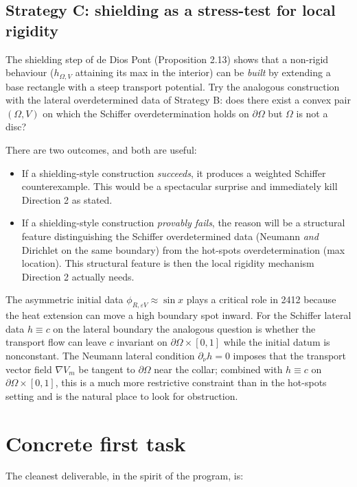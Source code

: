 \documentclass[11pt]{article}
\newcommand{\Om}{\Omega}
\newcommand{\eps}{\varepsilon}
\newcommand{\1}{\mathbf 1}
\begin{document}
\subsection*{Strategy C: shielding as a stress-test for local rigidity}

The shielding step of de Dios Pont (Proposition 2.13) shows that a
non-rigid behaviour ($h_{\Om,V}$ attaining its max in the interior) can
be \emph{built} by extending a base rectangle with a steep transport
potential. Try the analogous construction with the lateral
overdetermined data of Strategy B: does there exist a convex pair
$(\Om,V)$ on which the Schiffer overdetermination holds on
$\partial\Om$ but $\Om$ is not a disc?

There are two outcomes, and both are useful:
\begin{itemize}[leftmargin=*]
    \item If a shielding-style construction \emph{succeeds}, it
    produces a weighted Schiffer counterexample. This would be a
    spectacular surprise and immediately kill Direction 2 as stated.
    \item If a shielding-style construction \emph{provably fails},
    the reason will be a structural feature distinguishing the
    Schiffer overdetermined data (Neumann \emph{and} Dirichlet on
    the same boundary) from the hot-spots overdetermination
    (max location). This structural feature is then the local
    rigidity mechanism Direction 2 actually needs.
\end{itemize}
The asymmetric initial data $\phi_{R,\eps V}\approx\sin x$ plays a
critical role in 2412 because the heat extension can move a high
boundary spot inward. For the Schiffer lateral data $h\equiv c$ on the
lateral boundary the analogous question is whether the transport flow
can leave $c$ invariant on $\partial\Om\times[0,1]$ while the initial
datum is nonconstant. The Neumann lateral condition $\partial_\nu h=0$
imposes that the transport vector field $\nabla V_m$ be tangent to
$\partial\Om$ near the collar; combined with $h\equiv c$ on
$\partial\Om\times[0,1]$, this is a much more restrictive constraint
than in the hot-spots setting and is the natural place to look for
obstruction.

\section*{Concrete first task}

The cleanest deliverable, in the spirit of the program, is:
\end{document}
